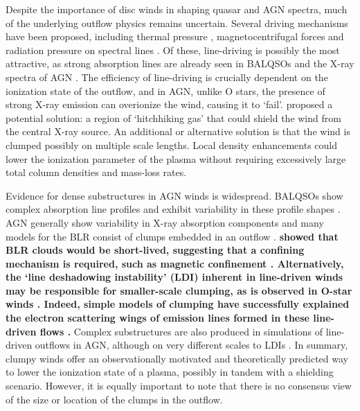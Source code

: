 \documentclass[useAMS,usenatbib]{mn2e_x}
\begin{document}
Despite the importance of disc winds in shaping quasar and AGN spectra,  
much of the underlying outflow physics remains uncertain. 
Several driving mechanisms have been proposed, including
thermal pressure \citep{weymann1982, begelman1991}, magnetocentrifugal forces 
\citep{blandfordpayne,pelletier_pudritz} and 
radiation pressure on spectral lines \citep[`line-driving';][]{lucysolomon1970,shlosman1985,MCGV95}.
Of these, line-driving is possibly the most attractive, as
strong absorption lines are already seen in BALQSOs and the X-ray spectra of AGN 
\citep{reeves2003,poundsreeves2009,tombesi2010a}.
The efficiency of line-driving is crucially dependent on the ionization state 
of the outflow, and in AGN, unlike O stars, 
the presence of strong X-ray emission can overionize the wind, 
causing it to `fail'.
\cite{MCGV95} proposed a potential solution: 
a region of `hitchhiking gas' that could shield the wind from the central X-ray source. 
An additional or alternative solution is that the wind is clumped 
{\bf \citep[e.g.][]{junk1983,weymann1985,hamann2013}}
possibly on multiple scale lengths. Local density enhancements could lower the 
ionization parameter of the plasma 
without requiring excessively large total column densities 
and mass-loss rates.

Evidence for dense substructures in AGN winds is widespread.
BALQSOs show complex absorption line profiles \citep{ganguly2006, simonhamann2010}
and exhibit variability in these profile shapes \citep{capellupo2011,capellupo2012,capellupo2014}.
AGN generally show variability in X-ray absorption components \citep[e.g.][]{risaliti2002}
and many models for the BLR consist of clumps embedded in an outflow 
\citep{krolik1981, emmering1992, dekool1995, cassidyraine1996}.
{\bf 
\cite{krolik1981} showed that BLR clouds would be short-lived, suggesting 
that a confining mechanism is required, such as
magnetic confinement \citep[e.g.][]{dekool1995}. Alternatively,
the `line deshadowing instability' (LDI) inherent in line-driven winds
\citep{lucysolomon1970,macgregor1979,carlberg1980,owockirybicki1984}
may be responsible for smaller-scale clumping, as is observed in O-star winds
\citep[][and references therein]{fullerton2011}.
Indeed, simple models of clumping have successfully explained the electron scattering 
wings of emission lines formed in these line-driven flows 
\citep{hillier1991eswingsmodel}.}
Complex substructures are also produced in simulations of line-driven 
outflows in AGN, although on very different scales to LDIs 
\citep{PSK2000,PK04,progakurosawa2010,proga2014}.  
In summary, clumpy winds offer an observationally motivated and theoretically 
predicted way to lower the ionization state of a plasma, possibly in tandem
with a shielding scenario. However, it is equally important to note that there 
is no consensus view of the size or location of the clumps in the outflow.
\end{document}
